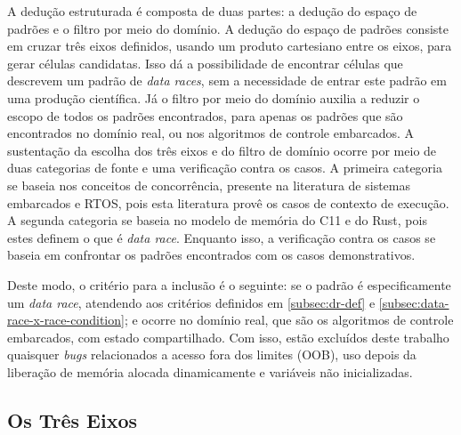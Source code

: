 A dedução estruturada é composta de duas partes: a dedução do espaço de padrões e o filtro por meio do domínio. A dedução do espaço de padrões consiste em cruzar três eixos definidos, usando um produto cartesiano entre os eixos, para gerar células candidatas. Isso dá a possibilidade de encontrar células que descrevem um padrão de \textit{data races}, sem a necessidade de entrar este padrão em uma produção científica. Já o filtro por meio do domínio auxilia a reduzir o escopo de todos os padrões encontrados, para apenas os padrões que são encontrados no domínio real, ou nos algoritmos de controle embarcados. A sustentação da escolha dos três eixos e do filtro de domínio ocorre por meio de duas categorias de fonte e uma verificação contra os casos. A primeira categoria se baseia nos conceitos de concorrência, presente na literatura de sistemas embarcados e \ac{RTOS}, pois esta literatura provê os casos de contexto de execução. A segunda categoria se baseia no modelo de memória do C11 e do Rust, pois estes definem o que é \textit{data race}. Enquanto isso, a verificação contra os casos se baseia em confrontar os padrões encontrados com os casos demonstrativos.

Deste modo, o critério para a inclusão é o seguinte: se o padrão é especificamente um \textit{data race}, atendendo aos critérios definidos em \ref{subsec:dr-def} e \ref{subsec:data-race-x-race-condition}; e ocorre no domínio real, que são os algoritmos de controle embarcados, com estado compartilhado. Com isso, estão excluídos deste trabalho quaisquer \textit{bugs} relacionados a acesso fora dos limites (OOB), uso depois da liberação de memória alocada dinamicamente e variáveis não inicializadas.

\subsection{Os Três Eixos}
\label{subsec:three-axis}


